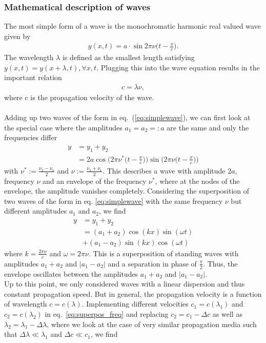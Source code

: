 \documentclass[a4paper,10pt,twocolumn]{article}
\begin{document}
    \subsubsection{Mathematical description of waves}
    The most simple form of a wave is the monochromatic harmonic real valued wave given by
    \begin{align}\label{eq:simplewave}
    y(x,t)=a\cdot\sin{2\pi\nu\Big(t-\frac{x}{c}\Big)}.
    \end{align}
    The wavelength $\lambda$ is defined as the smallest length satisfying $y(x,t)={y(x+\lambda,t), \forall x,t}$. Plugging this into the wave equation results in the important relation
    \begin{align*}
        c=\lambda\nu,
    \end{align*}
    where c is the propagation velocity of the wave.
    \\\\Adding up two waves of the form in eq.~(\ref{eq:simplewave}), we can first look at the special case where the amplitudes $a_1=a_2=:a$ are the same and only the frequencies differ
    \begin{align}
        y&=y_1+y_2 \nonumber\\&=2a\cos{\Big(2\pi\nu^*\big(t-\frac{x}{c}\big)\Big)}\sin{\Big(2\pi\nu\big(t-\frac{x}{c}\big)\Big)}
        \label{eq:superpos_freq}
    \end{align}
    with $\nu^*:=\frac{\nu_2-\nu_1}{2}$ and $\nu:=\frac{\nu_2+\nu_1}{2}$. This describes a wave with amplitude $2a$, frequency $\nu$ and an envelope of the frequency $\nu^*$, where at the nodes of the envelope, the amplitude vanishes completely. Considering the superposition of two waves of the form in eq. \ref{eq:simplewave} with the same frequency $\nu$ but different amplitudes $a_1$ and $a_2$, we find
    \begin{align}
        y&=y_1+y_2\nonumber\\&=(a_1+a_2)\cos{(kx)}\sin{(\omega t)}\nonumber\\&+ (a_1-a_2)\sin{(kx)}\cos{(\omega t)}
        \label{eq:superpos_amp}
    \end{align}
    where $k=\frac{2\pi\nu}{c}$ and $\omega=2\pi\nu$. This is a superposition of standing waves with amplitudes $a_1+a_2$ and $|a_1-a_2|$ and a separation in phase of $\frac{\pi}{2}$. Thus, the envelope oscillates between the amplitudes $a_1+a_2$ and $|a_1-a_2|$.\\
    Up to this point, we only considered waves with a linear dispersion and thus constant propagation speed. But in general, the propagation velocity is a function of wavelength $c=c(\lambda)$. Implementing different velocities $c_1=c(\lambda_1)$ and $c_2=c(\lambda_2)$ in eq.~\ref{eq:superpos_freq} and replacing $c_2=c_1-\Delta c$ as well as $\lambda_2=\lambda_1-\Delta\lambda$, where we look at the case of very similar propagation media such that $\Delta\lambda \ll \lambda_1$ and $\Delta c \ll c_1$, we find
\end{document}

